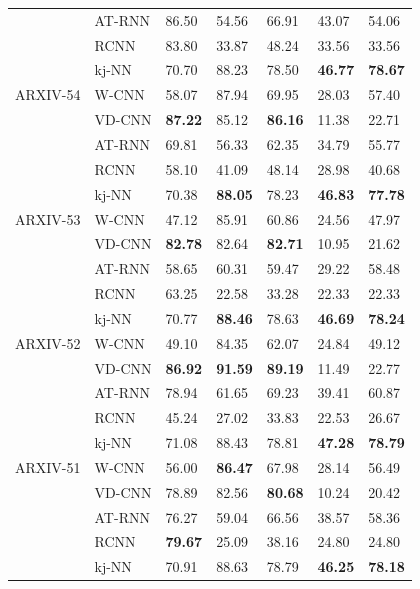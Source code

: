 \begin{table}
\begin{tabularx}{\columnwidth}{XXXXXXX}
          & \gls{AT-RNN}   & 86.50 &	54.56 &	66.91 &	43.07 &	54.06 	 \\
          & \gls{RCNN}      & 83.80 &	33.87 &	48.24 &	33.56 &	33.56 	 \\
          & \gls{kj-NN}     & 70.70 &	88.23 &	78.50 &	\bfseries46.77 & \bfseries78.67 \\ \midrule
ARXIV-54    & \gls{W-CNN}     & 58.07 &	87.94 &	69.95 &	28.03 &	57.40 \\
         & \gls{VD-CNN}    & \bfseries87.22 & 	85.12 &\bfseries	86.16 &	11.38 &	22.71  \\
          & \gls{AT-RNN}   & 69.81 &	56.33 &	62.35 &	34.79 &	55.77 \\
          & \gls{RCNN}      & 58.10 &	41.09 &	48.14 &	28.98 &	40.68 \\
          & \gls{kj-NN}     & 70.38 &	\bfseries88.05 &	78.23 &	\bfseries46.83 &	\bfseries77.78 \\ \midrule
ARXIV-53    & \gls{W-CNN}     & 47.12 &	85.91 &	60.86 &	24.56 &	47.97 \\
         & \gls{VD-CNN}    & \bfseries82.78 &	82.64 &\bfseries	82.71 &	10.95 &	21.62 	 \\
          & \gls{AT-RNN}   & 58.65 &	60.31 &	59.47 &	29.22 &	58.48 \\
          & \gls{RCNN}      & 63.25 &	22.58 &	33.28 &	22.33 &	22.33 	 \\
          & \gls{kj-NN}     & 70.77 &	\bfseries88.46 &	78.63 &	\bfseries46.69 &	\bfseries78.24 \\ \midrule
ARXIV-52    & \gls{W-CNN}     & 49.10 &	84.35& 	62.07 &	24.84 &	49.12 	\\
         & \gls{VD-CNN}    & \bfseries86.92 &	\bfseries91.59 	& \bfseries89.19 &	11.49 &	22.77 \\
          & \gls{AT-RNN}   & 78.94 & 61.65 &	69.23 &	39.41 &	60.87 	 \\
          & \gls{RCNN}      & 45.24 &	27.02 &	33.83 &	22.53 &	26.67 	 \\
          & \gls{kj-NN}     & 71.08 &	88.43 &	78.81 &	\bfseries47.28 &	\bfseries78.79 \\ \midrule
ARXIV-51    & \gls{W-CNN}     & 56.00 &	\bfseries86.47 &	67.98 &	28.14 &	56.49 	 \\
         & \gls{VD-CNN}    &78.89  &	82.56 &	\bfseries80.68 &	10.24 &	20.42 	 	 	 \\
          & \gls{AT-RNN}   & 76.27 &	59.04 &	66.56 &	38.57 &	58.36 \\
          & \gls{RCNN}      & \bfseries79.67 &	25.09 &	38.16 &	24.80 &	24.80 \\ 
          & \gls{kj-NN}     & 70.91 &	88.63 &	78.79 &	\bfseries46.25 &	\bfseries78.18 \\ \bottomrule
\end{tabularx}
\end{table}

